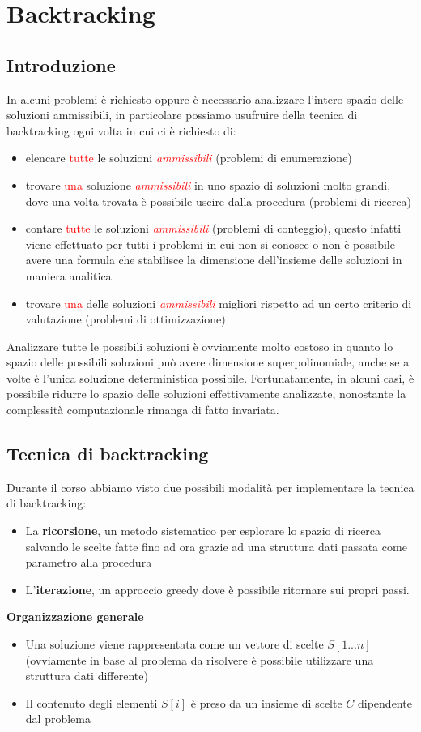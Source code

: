 \documentclass[../cheatSheetAlgoritmi.tex]{subfiles}
\begin{document}
\section{Backtracking}
\subsection{Introduzione}
In alcuni problemi è richiesto oppure è necessario analizzare l'intero spazio delle soluzioni ammissibili, in particolare possiamo usufruire della tecnica di backtracking ogni volta in cui ci è richiesto di:
\begin{itemize}
	\item elencare \textcolor{red}{tutte} le soluzioni \textcolor{red}{\emph{ammissibili}} (problemi di enumerazione)
	\item trovare  \textcolor{red}{una} soluzione \textcolor{red}{\emph{ammissibili}} in uno spazio di soluzioni molto grandi, dove una volta trovata è possibile uscire dalla procedura (problemi di ricerca)
	\item contare  \textcolor{red}{tutte} le soluzioni \textcolor{red}{\emph{ammissibili}} (problemi di conteggio), questo infatti viene effettuato per tutti i problemi in cui non si conosce o non è possibile avere una formula che stabilisce la dimensione dell'insieme delle soluzioni in maniera analitica.
	\item trovare \textcolor{red}{una} delle soluzioni \textcolor{red}{\emph{ammissibili}} migliori rispetto ad un certo criterio di valutazione (problemi di ottimizzazione)
\end{itemize}
Analizzare tutte le possibili soluzioni è ovviamente molto costoso in quanto lo spazio delle possibili soluzioni può avere dimensione superpolinomiale, anche se a volte è l'unica soluzione deterministica possibile. Fortunatamente, in alcuni casi, è possibile ridurre lo spazio delle soluzioni effettivamente analizzate, nonostante la complessità computazionale rimanga di fatto invariata. 
\subsection{Tecnica di backtracking}
Durante il corso abbiamo visto due possibili modalità per implementare la tecnica di backtracking: 
\begin{itemize}
	\item La \textbf{ricorsione}, un metodo sistematico per esplorare lo spazio di ricerca salvando le scelte fatte fino ad ora grazie ad una struttura dati passata come parametro alla procedura
	\item L'\textbf{iterazione}, un approccio greedy dove è possibile ritornare sui propri passi.
\end{itemize}
\textbf{Organizzazione generale} 
\begin{itemize}
	\item Una soluzione viene rappresentata come un vettore di scelte $S[1...n]$ (ovviamente in base al problema da risolvere è possibile utilizzare una struttura dati differente)
	\item Il contenuto degli elementi $S[i]$ è preso da un insieme di scelte $C$ dipendente dal problema
\end{itemize}
\end{document}
